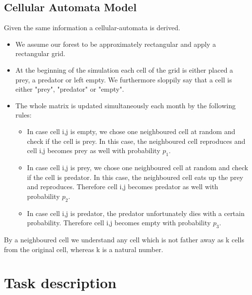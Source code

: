 \documentclass[a4paper,12pt]{article}
\begin{document}
\subsection{Cellular Automata Model}
Given the same information a cellular-automata is derived.\\
\begin{itemize}
\item{We assume our forest to be approximately rectangular and apply a rectangular grid.}
\item{At the beginning of the simulation each cell of the grid is either placed a prey, a predator or left
empty. We furthermore sloppily say that a cell is either "prey", "predator" or "empty".}
\item{The whole matrix is updated simultaneously each month by the following rules:}
\begin{itemize}
\item{In case cell i,j is empty, we chose one neighboured cell at random and check if the cell is prey. In
this case, the neighboured cell reproduces and cell i,j becomes prey as well with probability $p_1$.}
\item{In case cell i,j is prey, we chose one neighboured cell at random and check if the cell is predator.
In this case, the neighboured cell eats up the prey and reproduces. Therefore cell i,j becomes
predator as well with probability $p_2$.}
\item{In case cell i,j is predator, the predator unfortunately dies with a certain probability. Therefore
cell i,j becomes empty with probability $p_3$.}
\end{itemize}
\end{itemize}

By a neighboured cell we understand any cell which is not father away as k cells from the original cell,
whereas k is a natural number.

\section{Task description}
\end{document}
